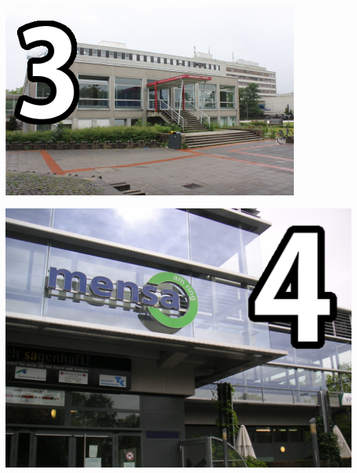 {\vspace{1ex}

\begin{minipage}[c]{0.45\textwidth}
	\includegraphics[width=\columnwidth]{res/lageplan/3_AP.jpg}
\end{minipage}
\hfill
\begin{minipage}[c]{0.45\textwidth}
	\includegraphics[width=\columnwidth]{res/lageplan/4_Mensa.jpg}
\end{minipage}

}
